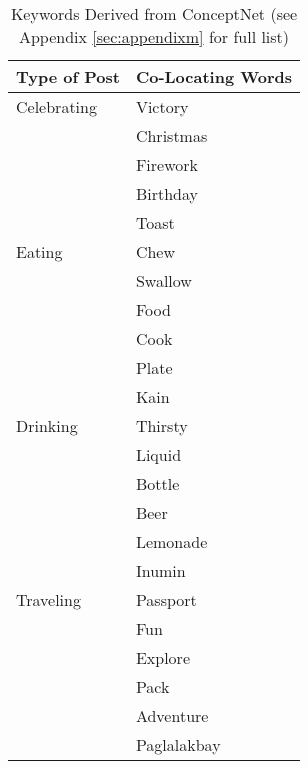 \begin{table}[ph!]   %
	\centering
	\caption{Keywords Derived from ConceptNet (see Appendix \ref{sec:appendixm} for full list)} \vspace{0.25em}
	\begin{tabular}{|p{1.5in}|p{2in}|} \hline
		\centering Type of Post & Co-Locating Words \\ \hline
		Celebrating 
		& Victory \\ 
		& Christmas \\ 
		& Firework \\ 
		& Birthday \\ 
		& Toast \\\hline
		Eating  
		& Chew \\ 
		& Swallow \\ 
		& Food \\ 
		& Cook \\ 
		& Plate \\ 
		& Kain \\\hline
		
		Drinking 
		& Thirsty \\ 
		& Liquid \\
		& Bottle \\ 
		& Beer \\ 
		& Lemonade \\ 
		& Inumin \\\hline
		Traveling 
		& Passport \\ 
		& Fun \\ 
		& Explore \\ 
		& Pack \\ 
		& Adventure \\ 
		& Paglalakbay  \\\hline
	\end{tabular}
	\label{tab:EventClassificationConceptNet}
\end{table}

